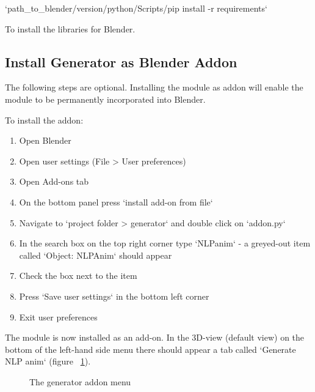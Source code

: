 \indent `path\_to\_blender/version/python/Scripts/pip install -r requirements`

\noindent To install the libraries for Blender.

\subsection{Install Generator as Blender Addon \label{sec:installaddon}}
The following steps are optional. Installing the module as addon will enable the module to be permanently incorporated into Blender.

\noindent To install the addon:
\begin{enumerate}
	\item Open Blender
	\item Open user settings (File > User preferences)
	\item Open Add-ons tab
	\item On the bottom panel press `install add-on from file`
	\item Navigate to `project folder > generator` and double click on `addon.py`
	\item In the search box on the top right corner type `NLPanim` - a greyed-out item called `Object: NLPAnim` should appear
	\item Check the box next to the item
	\item Press `Save user settings` in the bottom left corner
	\item Exit user preferences
\end{enumerate}

\noindent The module is now installed as an add-on. In the 3D-view (default view) on the bottom of the left-hand side menu there should appear a tab called `Generate NLP anim` (figure ~\ref{fig:installedaddon}).
	
\begin{figure}[!ht]
	\centerline{}
	\caption{The generator addon menu}\label{fig:installedaddon}
\end{figure}

